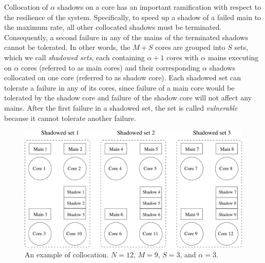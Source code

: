 Collocation of $\alpha$ shadows on a core has an important ramification with respect to the resilience of the system. Specifically, to speed up a shadow 
of a failed main to the maximum rate, all other collocated shadows must be terminated. Consequently, a second failure in any of the mains of the terminated shadows cannot be tolerated. In other words, the $M+S$ cores are grouped into $S$ sets, which we call \emph{shadowed sets}, each containing $\alpha+1$ cores with $\alpha$ mains executing on $\alpha$ cores (referred to as main cores) and their corresponding $\alpha$ shadows collocated on one core (referred to as shadow core). Each shadowed set can tolerate a failure in any of its cores, since failure of a main core would be tolerated by the shadow core and failure of the shadow core will not affect any mains. After the first failure in a shadowed set, the set is called \emph{vulnerable} because it cannot tolerate another failure. %

\begin{figure}[!t]
  \begin{center}
    \includegraphics[width=\columnwidth]{Figures/sc_mapping.pdf}
  \end{center}
  \caption{An example of collocation. $N=12$, $M=9$, $S=3$, and $\alpha=3$.}
  \label{fig:sc_mapping}
\end{figure}





